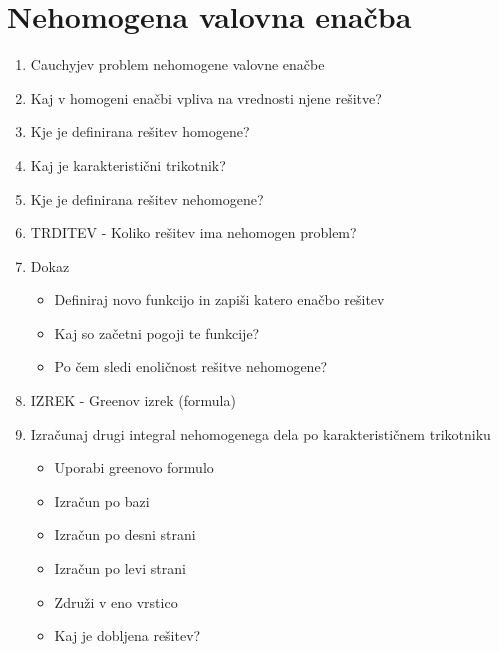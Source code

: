 \documentclass{article}
\begin{document}
    \section{Nehomogena valovna enačba}
    \begin{enumerate}
        \item Cauchyjev problem nehomogene valovne enačbe
        \item Kaj v homogeni enačbi vpliva na vrednosti njene rešitve?
        \item Kje je definirana rešitev homogene?
        \item Kaj je karakteristični trikotnik?
        \item Kje je definirana rešitev nehomogene?
        \item TRDITEV - Koliko rešitev ima nehomogen problem?
        \item Dokaz
        \begin{itemize}
            \item Definiraj novo funkcijo in zapiši katero enačbo rešitev
            \item Kaj so začetni pogoji te funkcije?
            \item Po čem sledi enoličnost rešitve nehomogene?
        \end{itemize}
        \item IZREK - Greenov izrek (formula)
        \item Izračunaj drugi integral nehomogenega dela po karakterističnem trikotniku
        \begin{itemize}
            \item Uporabi greenovo formulo
            \item Izračun po bazi
            \item Izračun po desni strani
            \item Izračun po levi strani
            \item Združi v eno vrstico
            \item Kaj je dobljena rešitev?
        \end{itemize}
    \end{enumerate}
\end{document}
